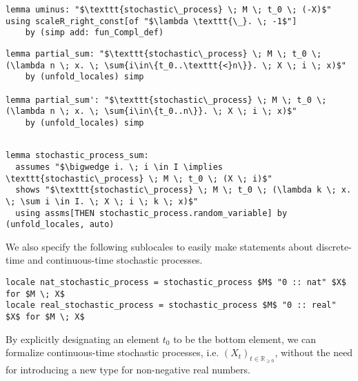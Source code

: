 \begin{isalemma}
{\small
\begin{lstlisting}[style=isabelle]
lemma uminus: "$\texttt{stochastic\_process} \; M \; t_0 \; (-X)$" using scaleR_right_const[of "$\lambda \texttt{\_}. \; -1$"] 
	by (simp add: fun_Compl_def)
\end{lstlisting}
}
\end{isalemma}

\begin{isalemma}
{\small
\begin{lstlisting}[style=isabelle]
lemma partial_sum: "$\texttt{stochastic\_process} \; M \; t_0 \; (\lambda n \; x. \; \sum{i\in\{t_0..\texttt{<}n\}}. \; X \; i \; x)$" 
	by (unfold_locales) simp

lemma partial_sum': "$\texttt{stochastic\_process} \; M \; t_0 \; (\lambda n \; x. \; \sum{i\in\{t_0..n\}}. \; X \; i \; x)$" 
	by (unfold_locales) simp
\end{lstlisting}
}
\end{isalemma}

\begin{isalemma}
{\small
\begin{lstlisting}[style=isabelle]

lemma stochastic_process_sum:
  assumes "$\bigwedge i. \; i \in I \implies \texttt{stochastic\_process} \; M \; t_0 \; (X \; i)$"
  shows "$\texttt{stochastic\_process} \; M \; t_0 \; (\lambda k \; x. \; \sum i \in I. \; X \; i \; k \; x)$" 
  using assms[THEN stochastic_process.random_variable] by (unfold_locales, auto)

\end{lstlisting}
}
\end{isalemma}

We also specify the following sublocales to easily make statements about discrete-time and continuous-time stochastic processes.

\begin{isadefinition}
{\small
\begin{lstlisting}[style=isabelle]
locale nat_stochastic_process = stochastic_process $M$ "0 :: nat" $X$ for $M \; X$
locale real_stochastic_process = stochastic_process $M$ "0 :: real" $X$ for $M \; X$
\end{lstlisting}
}
\end{isadefinition}

By explicitly designating an element $t_0$ to be the bottom element, we can formalize continuous-time stochastic processes, i.e. $(X_t)_{t \in \mathbb{R}_{\ge 0}}$, without the need for introducing a new type for non-negative real numbers. 

